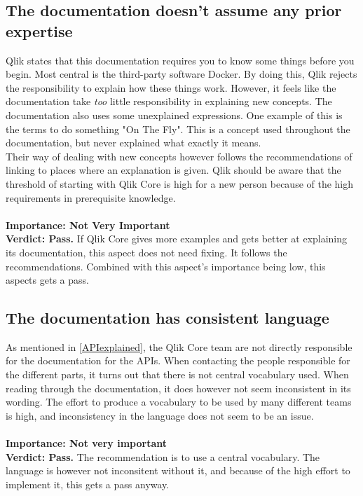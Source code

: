 \documentclass{cslthse-msc}
\begin{document}
    \subsection{The documentation doesn’t assume any prior expertise}
    Qlik states that this documentation requires you to know some things before you begin. Most central is the third-party software Docker. By doing this, Qlik rejects the responsibility to explain how these things work. However, it feels like the documentation take \textit{too} little responsibility in explaining new concepts. The documentation also uses some unexplained expressions. One example of this is the terms to do something "On The Fly". This is a concept used throughout the documentation, but never explained what exactly it means. \\ Their way of dealing with new concepts however follows the recommendations of linking to places where an explanation is given. Qlik should be aware that the threshold of starting with Qlik Core is high for a new person because of the high requirements in prerequisite knowledge.\\ \\
    \textbf{Importance: Not Very Important}\\
    \textbf{Verdict: Pass.} If Qlik Core gives more examples and gets better at explaining its documentation, this aspect does not need fixing. It follows the recommendations. Combined with this aspect's importance being low, this aspects gets a pass.
    \subsection{The documentation has consistent language}
    As mentioned in \ref{APIexplained}, the Qlik Core team are not directly responsible for the documentation for the APIs. When contacting the people responsible for the different parts, it turns out that there is not central vocabulary used. When reading through the documentation, it does however not seem inconsistent in its wording. The effort to produce a vocabulary to be used by many different teams is high, and inconsistency in the language does not seem to be an issue. \\ \\
    \textbf{Importance: Not very important}\\
    \textbf{Verdict: Pass.} The recommendation is to use a central vocabulary. The language is however not inconsitent without it, and because of the high effort to implement it, this gets a pass anyway.
\end{document}
